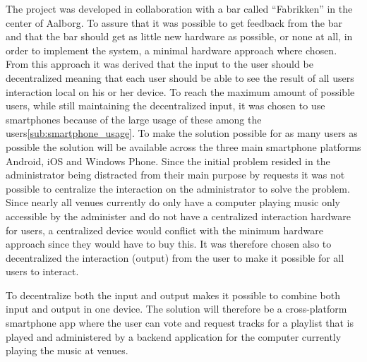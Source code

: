 The project was developed in collaboration with a bar called \enquote{Fabrikken} in the center of Aalborg. To assure that it was possible to get feedback from the bar and that the bar should get as little new hardware as possible, or none at all, in order to implement the system, a minimal hardware approach where chosen.
From this approach it was derived that the input to the user should be decentralized meaning that each user should be able to see the result of all users interaction local on his or her device. To reach the maximum amount of possible users, while still maintaining the decentralized input, it was chosen to use smartphones because of the large usage of these among the users\cref{sub:smartphone_usage}. To make the solution possible for as many users as possible the solution will be available across the three main smartphone platforms Android, iOS and Windows Phone.
Since the initial problem resided in the administrator being distracted from their main purpose by requests it was not possible to centralize the interaction on the administrator to solve the problem. Since nearly all venues currently do only have a computer playing music only accessible by the administer and do not have a centralized interaction hardware for users, a centralized device would conflict with the minimum hardware approach since they would have to buy this. It was therefore chosen also to decentralized the interaction (output) from the user to make it possible for all users to interact.

To decentralize both the input and output makes it possible to combine both input and output in one device. The solution will therefore be a cross-platform smartphone app where the user can vote and request tracks for a playlist that is played and administered by a backend application for the computer currently playing the music at venues.
